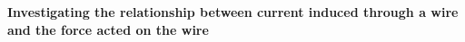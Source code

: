 \documentclass[12pt]{article}
\begin{document}
	\begin{center}
		\large \textbf{Investigating the relationship between current induced through a wire and the force acted on the wire}
	\end{center}

    
\end{document}
